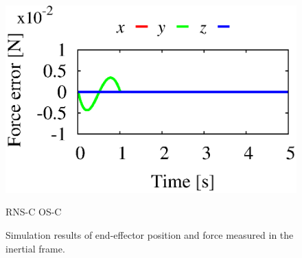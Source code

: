 \begin{figure}[t]
\begin{minipage}[h]{0.40\linewidth}
  \end{minipage}
  \begin{minipage}[h]{0.40\linewidth}
    \centering
    \includegraphics[width=1.0\linewidth]{fig/chapter6/results/spatial/OSF/OSF_U06_force_error.eps}
  \end{minipage}
  \footnotesize\par{RNS-C \hspace{13em} OS-C}
  \vspace{1em}
  \caption{Simulation results of end-effector position and force measured in the inertial frame.}
  \label{fig:RES_MF_7R_TASK}
\end{figure}
%
%
